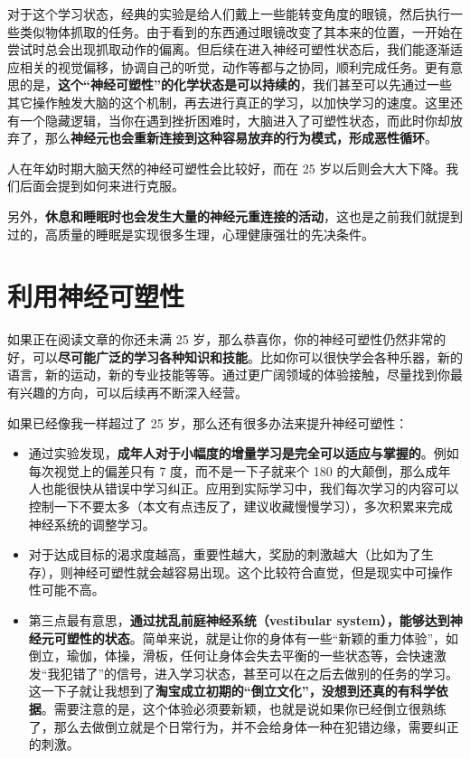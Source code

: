 \documentclass{report}
\begin{document}
对于这个学习状态，经典的实验是给人们戴上一些能转变角度的眼镜，然后执行一些类似物体抓取的任务。由于看到的东西通过眼镜改变了其本来的位置，一开始在尝试时总会出现抓取动作的偏离。但后续在进入神经可塑性状态后，我们能逐渐适应相关的视觉偏移，协调自己的听觉，动作等都与之协同，顺利完成任务。更有意思的是，\textbf{这个“神经可塑性”的化学状态是可以持续的}，我们甚至可以先通过一些其它操作触发大脑的这个机制，再去进行真正的学习，以加快学习的速度。这里还有一个隐藏逻辑，当你在遇到挫折困难时，大脑进入了可塑性状态，而此时你却放弃了，那么\textbf{神经元也会重新连接到这种容易放弃的行为模式，形成恶性循环}。

人在年幼时期大脑天然的神经可塑性会比较好，而在 25 岁以后则会大大下降。我们后面会提到如何来进行克服。

另外，\textbf{休息和睡眠时也会发生大量的神经元重连接的活动}，这也是之前我们就提到过的，高质量的睡眠是实现很多生理，心理健康强壮的先决条件。

\section{利用神经可塑性}

如果正在阅读文章的你还未满 25 岁，那么恭喜你，你的神经可塑性仍然非常的好，可以\textbf{尽可能广泛的学习各种知识和技能}。比如你可以很快学会各种乐器，新的语言，新的运动，新的专业技能等等。通过更广阔领域的体验接触，尽量找到你最有兴趣的方向，可以后续再不断深入经营。

如果已经像我一样超过了 25 岁，那么还有很多办法来提升神经可塑性：

\begin{itemize}
    \item 通过实验发现，\textbf{成年人对于小幅度的增量学习是完全可以适应与掌握的}。例如每次视觉上的偏差只有 7 度，而不是一下子就来个 180 的大颠倒，那么成年人也能很快从错误中学习纠正。应用到实际学习中，我们每次学习的内容可以控制一下不要太多（本文有点违反了，建议收藏慢慢学习），多次积累来完成神经系统的调整学习。
    \item 对于达成目标的渴求度越高，重要性越大，奖励的刺激越大（比如为了生存），则神经可塑性就会越容易出现。这个比较符合直觉，但是现实中可操作性可能不高。
    \item 第三点最有意思，\textbf{通过扰乱前庭神经系统（vestibular system），能够达到神经元可塑性的状态}。简单来说，就是让你的身体有一些“新颖的重力体验”，如倒立，瑜伽，体操，滑板，任何让身体会失去平衡的一些状态等，会快速激发“我犯错了”的信号，进入学习状态，甚至可以在之后去做别的任务的学习。这一下子就让我想到了\textbf{淘宝成立初期的“倒立文化”，没想到还真的有科学依据}。需要注意的是，这个体验必须要新颖，也就是说如果你已经倒立很熟练了，那么去做倒立就是个日常行为，并不会给身体一种在犯错边缘，需要纠正的刺激。
\end{itemize}
\end{document}
